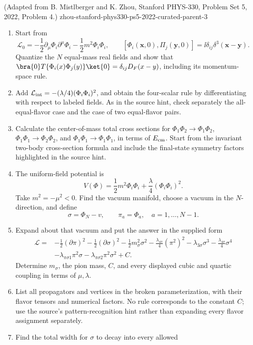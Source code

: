 \begin{enumerate}
  {(Adapted from B. Mistlberger and K. Zhou, Stanford PHYS-330, Problem Set 5, 2022, Problem 4.)}
  {zhou-stanford-phys330-ps5-2022-curated-parent-3}
\begin{enumerate}
\item Start from
\[
 \mathcal L_0=-\frac12\partial_\mu\Phi_i\partial^\mu\Phi_i
 -\frac12m^2\Phi_i\Phi_i,\qquad
 [\Phi_i(\mathbf x,0),\Pi_j(\mathbf y,0)]
 =\ii\delta_{ij}\delta^3(\mathbf x-\mathbf y).
\]
Quantize the \(N\) equal-mass real fields and show that
\(\bra{0}T\{\Phi_i(x)\Phi_j(y)\}\ket{0}
=\delta_{ij}D_F(x-y)\), including its momentum-space rule.
\item Add
\(\mathcal L_{\rm int}=-(\lambda/4)(\Phi_i\Phi_i)^2\), and obtain the
four-scalar rule by differentiating with respect to labeled fields.
As in the source hint, check separately the all-equal-flavor case and
the case of two equal-flavor pairs.
\item Calculate the center-of-mass total cross sections for
\(\Phi_1\Phi_2\to\Phi_1\Phi_2\),
\(\Phi_1\Phi_1\to\Phi_2\Phi_2\), and
\(\Phi_1\Phi_1\to\Phi_1\Phi_1\), in terms of \(E_{\rm cm}\).  Start from
the invariant two-body cross-section formula and include the
final-state symmetry factors highlighted in the source hint.
\item The uniform-field potential is
\[
 V(\Phi)=\frac12m^2\Phi_i\Phi_i
 +\frac{\lambda}{4}(\Phi_i\Phi_i)^2.
\]
Take \(m^2=-\mu^2<0\).  Find the vacuum manifold, choose a vacuum in the
\(N\)-direction, and define
\[
 \sigma=\Phi_N-v,\qquad \pi_a=\Phi_a,\quad a=1,\ldots,N-1.
\]
\item Expand about that vacuum and put the answer in the supplied form
\[
\begin{split}
 \mathcal L={}&-\frac12(\partial\pi)^2-\frac12(\partial\sigma)^2
 -\frac12m_\sigma^2\sigma^2
 -\frac{\lambda_{4\pi}}4(\pi^2)^2-\lambda_{3\sigma}\sigma^3
 -\frac{\lambda_{4\sigma}}4\sigma^4\\
 &-\lambda_{\pi\sigma1}\pi^2\sigma
 -\lambda_{\pi\sigma2}\pi^2\sigma^2+C .
\end{split}
\]
Determine \(m_\sigma\), the pion mass, \(C\), and every displayed cubic
and quartic coupling in terms of \(\mu,\lambda\).
\item List all propagators and vertices in the broken parameterization,
with their flavor tensors and numerical factors.  No rule corresponds to
the constant \(C\); use the source's pattern-recognition hint rather than
expanding every flavor assignment separately.
\item Find the total width for \(\sigma\) to decay into every allowed

\end{enumerate}
\end{enumerate}
